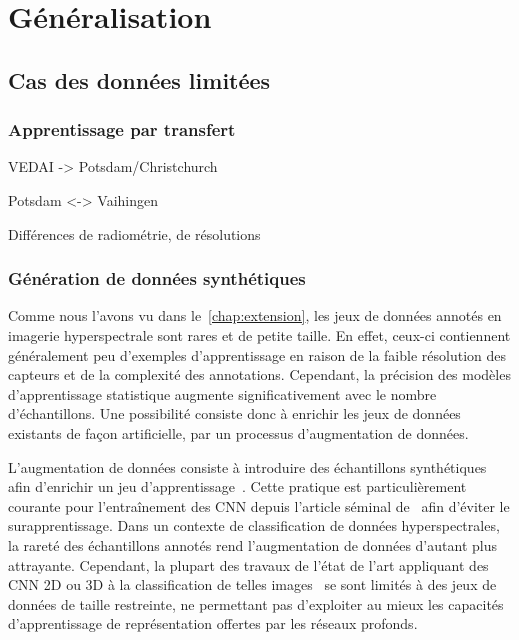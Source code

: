 \chapter{Généralisation}
\label{chap:generalisation}
\minitoc

\chapsummary{%

}

\newpage

\section{Cas des données limitées}

\subsection{Apprentissage par transfert}

VEDAI -> Potsdam/Christchurch

Potsdam <-> Vaihingen

Différences de radiométrie, de résolutions

\subsection{Génération de données synthétiques}

Comme nous l'avons vu dans le~\cref{chap:extension}, les jeux de données annotés en imagerie hyperspectrale sont rares et de petite taille. En effet, ceux-ci contiennent généralement peu d'exemples d'apprentissage en raison de la faible résolution des capteurs et de la complexité des annotations. Cependant, la précision des modèles d'apprentissage statistique augmente significativement avec le nombre d'échantillons. Une possibilité consiste donc à enrichir les jeux de données existants de façon artificielle, par un processus d'augmentation de données.

L'augmentation de données consiste à introduire des échantillons synthétiques afin d'enrichir un jeu d'apprentissage~\cite{dyk_art_2012}. Cette pratique est particulièrement courante pour l'entraînement des \gls{CNN} depuis l'article séminal de~\citet{krizhevsky_imagenet_2012} afin d'éviter le surapprentissage. Dans un contexte de classification de données hyperspectrales, la rareté des échantillons annotés rend l'augmentation de données d'autant plus attrayante. Cependant, la plupart des travaux de l'état de l'art appliquant des \gls{CNN} 2D ou 3D à la classification de telles images~\cite{chen_deep_2016,makantasis_deep_2015,slavkovikj_hyperspectral_2015,lee_contextual_2016} se sont limités à des jeux de données de taille restreinte, ne permettant pas d'exploiter au mieux les capacités d'apprentissage de représentation offertes par les réseaux profonds.

